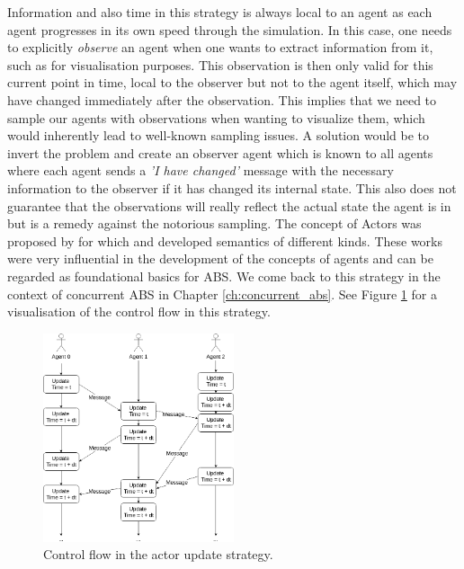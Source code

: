 Information and also time in this strategy is always local to an agent as each agent progresses in its own speed through the simulation. In this case, one needs to explicitly \textit{observe} an agent when one wants to extract information from it, such as for visualisation purposes. This observation is then only valid for this current point in time, local to the observer but not to the agent itself, which may have changed immediately after the observation. This implies that we need to sample our agents with observations when wanting to visualize them, which would inherently lead to well-known sampling issues. A solution would be to invert the problem and create an observer agent which is known to all agents where each agent sends a \textit{'I have changed'} message with the necessary information to the observer if it has changed its internal state. This also does not guarantee that the observations will really reflect the actual state the agent is in but is a remedy against the notorious sampling. The concept of Actors was proposed by \cite{hewitt_universal_1973} for which \cite{grief_semantics_1975} and \cite{clinger_foundations_1981} developed semantics of different kinds. These works were very influential in the development of the concepts of agents and can be regarded as foundational basics for ABS. We come back to this strategy in the context of concurrent ABS in Chapter \ref{ch:concurrent_abs}. See Figure \ref{fig:strategy_act} for a visualisation of the control flow in this strategy.

\begin{figure}[H]
	\centering
	\includegraphics[width=0.5\textwidth, angle=0]{./fig/implabs/actor.png}
	\caption[Control flow in the actor update strategy]{Control flow in the actor update strategy.}
	\label{fig:strategy_act}
\end{figure}

